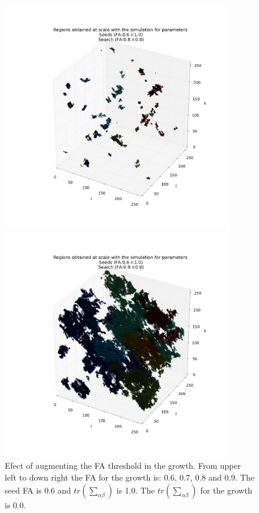 \documentclass[12pt]{article}
\begin{document}
\begin{figure}[ht]
\begin{minipage}{.45\textwidth}
\end{minipage}
\begin{minipage}{.45\textwidth}
  \centering
  \includegraphics[width=0.9\textwidth]{groups/3d/seeds_FA_6/regions_nonoise_seeds_FA_06_Trace_10_search_FA_08_Trace_00_.png}
\end{minipage}
\begin{minipage}{.45\textwidth}
  \centering
  \includegraphics[width=0.9\textwidth]{groups/3d/seeds_FA_6/regions_nonoise_seeds_FA_06_Trace_10_search_FA_09_Trace_00_.png}
\end{minipage}
\caption{Efect of augmenting the FA threshold in the growth. From upper left to down right the FA for the growth is: 0.6, 0.7, 0.8 and 0.9. The seed FA is 0.6 and $tr \left(\sum_{\alpha\beta}\right)$ is 1.0. The $tr \left(\sum_{\alpha\beta}\right)$ for the growth is 0.0.} \label{fg:3D_FA_growth}
\end{figure}
\FloatBarrier
\end{document}
